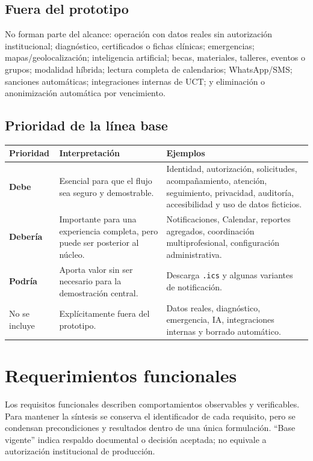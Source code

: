 \documentclass[10pt,a4paper,oneside]{article}
\newcommand{\must}{\textbf{Debe}}
\newcommand{\should}{\textbf{Debería}}
\newcommand{\could}{\textbf{Podría}}
\begin{document}
\subsection{Fuera del prototipo}

No forman parte del alcance: operación con datos reales sin autorización institucional; diagnóstico, certificados o fichas clínicas; emergencias; mapas/geolocalización; inteligencia artificial; becas, materiales, talleres, eventos o grupos; modalidad híbrida; lectura completa de calendarios; WhatsApp/SMS; sanciones automáticas; integraciones internas de UCT; y eliminación o anonimización automática por vencimiento.

\subsection{Prioridad de la línea base}

\begin{tabularx}{\textwidth}{@{}L{0.16\textwidth}L{0.28\textwidth}Y@{}}
\toprule
\textbf{Prioridad} & \textbf{Interpretación} & \textbf{Ejemplos}\\
\midrule
\must & Esencial para que el flujo sea seguro y demostrable. & Identidad, autorización, solicitudes, acompañamiento, atención, seguimiento, privacidad, auditoría, accesibilidad y uso de datos ficticios.\\
\should & Importante para una experiencia completa, pero puede ser posterior al núcleo. & Notificaciones, Calendar, reportes agregados, coordinación multiprofesional, configuración administrativa.\\
\could & Aporta valor sin ser necesario para la demostración central. & Descarga \texttt{.ics} y algunas variantes de notificación.\\
No se incluye & Explícitamente fuera del prototipo. & Datos reales, diagnóstico, emergencia, IA, integraciones internas y borrado automático.\\
\bottomrule
\end{tabularx}
\section{Requerimientos funcionales}

Los requisitos funcionales describen comportamientos observables y verificables. Para mantener la síntesis se conserva el identificador de cada requisito, pero se condensan precondiciones y resultados dentro de una única formulación. ``Base vigente'' indica respaldo documental o decisión aceptada; no equivale a autorización institucional de producción.
\end{document}
